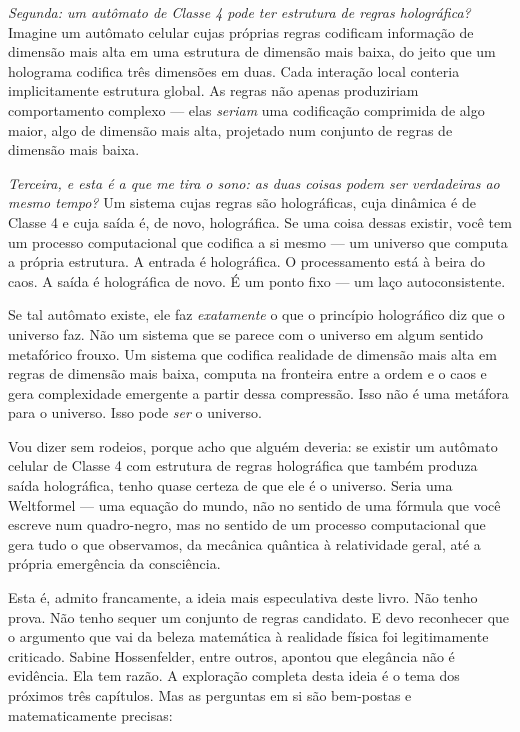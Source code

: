 \documentclass[11pt, twoside, openright]{book}
\begin{document}
\textit{Segunda: um autômato de Classe 4 pode ter estrutura de regras holográfica?} Imagine um autômato celular cujas próprias regras codificam informação de dimensão mais alta em uma estrutura de dimensão mais baixa, do jeito que um holograma codifica três dimensões em duas. Cada interação local conteria implicitamente estrutura global. As regras não apenas produziriam comportamento complexo --- elas \textit{seriam} uma codificação comprimida de algo maior, algo de dimensão mais alta, projetado num conjunto de regras de dimensão mais baixa.

\textit{Terceira, e esta é a que me tira o sono: as duas coisas podem ser verdadeiras ao mesmo tempo?} Um sistema cujas regras são holográficas, cuja dinâmica é de Classe 4 e cuja saída é, de novo, holográfica. Se uma coisa dessas existir, você tem um processo computacional que codifica a si mesmo --- um universo que computa a própria estrutura. A entrada é holográfica. O processamento está à beira do caos. A saída é holográfica de novo. É um ponto fixo --- um laço autoconsistente.

Se tal autômato existe, ele faz \textit{exatamente} o que o princípio holográfico diz que o universo faz. Não um sistema que se parece com o universo em algum sentido metafórico frouxo. Um sistema que codifica realidade de dimensão mais alta em regras de dimensão mais baixa, computa na fronteira entre a ordem e o caos e gera complexidade emergente a partir dessa compressão. Isso não é uma metáfora para o universo. Isso pode \textit{ser} o universo.

Vou dizer sem rodeios, porque acho que alguém deveria: se existir um autômato celular de Classe 4 com estrutura de regras holográfica que também produza saída holográfica, tenho quase certeza de que ele é o universo. Seria uma Weltformel --- uma equação do mundo, não no sentido de uma fórmula que você escreve num quadro-negro, mas no sentido de um processo computacional que gera tudo o que observamos, da mecânica quântica à relatividade geral, até a própria emergência da consciência.

Esta é, admito francamente, a ideia mais especulativa deste livro. Não tenho prova. Não tenho sequer um conjunto de regras candidato. E devo reconhecer que o argumento que vai da beleza matemática à realidade física foi legitimamente criticado. Sabine Hossenfelder, entre outros, apontou que elegância não é evidência. Ela tem razão. A exploração completa desta ideia é o tema dos próximos três capítulos. Mas as perguntas em si são bem-postas e matematicamente precisas:
\end{document}
